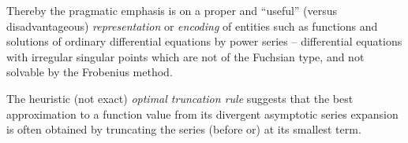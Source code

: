 Thereby the pragmatic emphasis is on a proper and ``useful'' (versus disadvantageous) {\em representation}
or {\em encoding} of entities such as functions and solutions of
ordinary differential equations by power series -- differential equations
with irregular singular points which are
not of the Fuchsian type, and not solvable by the Frobenius method.

The heuristic (not exact)
{\em optimal truncation rule}
suggests that the best approximation to a function value from its divergent asymptotic
series expansion is often obtained by truncating the series (before or) at its smallest term.


